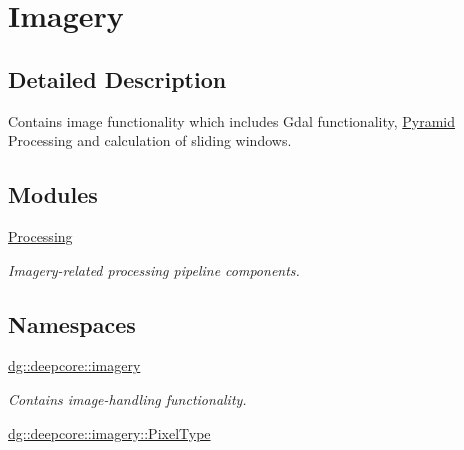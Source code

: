 \hypertarget{group___imagery_module}{}\section{Imagery}
\label{group___imagery_module}


\subsection{Detailed Description}
Contains image functionality which includes Gdal functionality, \hyperlink{classdg_1_1deepcore_1_1imagery_1_1_pyramid}{Pyramid} Processing and calculation of sliding windows. 

\subsection*{Modules}
\begin{DoxyCompactItemize}
\item 
\hyperlink{group___imagery_process}{Processing}
\begin{DoxyCompactList}\small\item\em Imagery-\/related processing pipeline components. \end{DoxyCompactList}\end{DoxyCompactItemize}
\subsection*{Namespaces}
\begin{DoxyCompactItemize}
\item 
 \hyperlink{namespacedg_1_1deepcore_1_1imagery}{dg\+::deepcore\+::imagery}
\begin{DoxyCompactList}\small\item\em Contains image-\/handling functionality. \end{DoxyCompactList}\item 
 \hyperlink{namespacedg_1_1deepcore_1_1imagery_1_1_pixel_type}{dg\+::deepcore\+::imagery\+::\+Pixel\+Type}
\end{DoxyCompactItemize}
